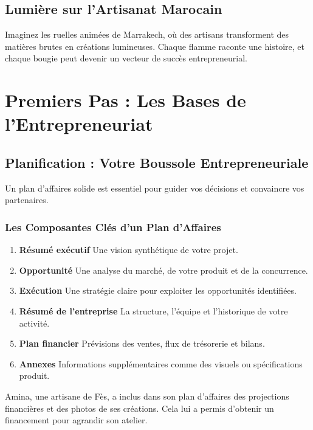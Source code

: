 \documentclass[11pt,fleqn,onecolumn,oneside]{book}
\begin{document}
\subsection*{Lumière sur l’Artisanat Marocain}

\begin{remark}
Imaginez les ruelles animées de Marrakech, où des artisans transforment des matières brutes en créations lumineuses. Chaque flamme raconte une histoire, et chaque bougie peut devenir un vecteur de succès entrepreneurial.
\end{remark}

\section{Premiers Pas : Les Bases de l’Entrepreneuriat}

\subsection*{Planification : Votre Boussole Entrepreneuriale}

Un plan d’affaires solide est essentiel pour guider vos décisions et convaincre vos partenaires.

\subsubsection*{Les Composantes Clés d’un Plan d’Affaires}

\begin{enumerate}
    \item \textbf{Résumé exécutif} Une vision synthétique de votre projet.
    \item \textbf{Opportunité} Une analyse du marché, de votre produit et de la concurrence.
    \item \textbf{Exécution} Une stratégie claire pour exploiter les opportunités identifiées.
    \item \textbf{Résumé de l’entreprise} La structure, l’équipe et l’historique de votre activité.
    \item \textbf{Plan financier} Prévisions des ventes, flux de trésorerie et bilans.
    \item \textbf{Annexes} Informations supplémentaires comme des visuels ou spécifications produit.
\end{enumerate}

\begin{example}
Amina, une artisane de Fès, a inclus dans son plan d’affaires des projections financières et des photos de ses créations. Cela lui a permis d’obtenir un financement pour agrandir son atelier.
\end{example}
\end{document}
